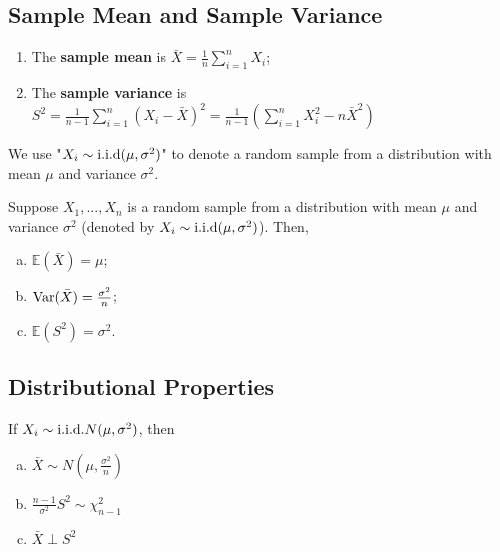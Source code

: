 \documentclass[11pt]{elegantbook}
\begin{document}
\subsection{Sample Mean and Sample Variance}
\begin{definition}
    \normalfont
    \begin{enumerate}
        \item The \textbf{sample mean} is $\bar{X}=\frac{1}{n}\sum_{i=1}^n X_i$;
        \item The \textbf{sample variance} is $S^2=\frac{1}{n-1}\sum_{i=1}^n (X_i-\bar{X})^2=\frac{1}{n-1}(\sum_{i=1}^n X_i^2 - n\bar{X}^2)$
    \end{enumerate}
\end{definition}

\begin{note}
    We use "$X_i\sim \textnormal{i.i.d}(\mu,\sigma^2)$" to denote a random sample from a distribution with mean $\mu$ and variance $\sigma^2$.
\end{note}

\begin{theorem}
    Suppose $X_1,...,X_n$ is a random sample from a distribution with mean $\mu$ and variance $\sigma^2$ (denoted by $X_i\sim \textnormal{i.i.d}(\mu,\sigma^2)$). Then,
    \begin{enumerate}[(a).]
        \item $\mathbb{E}(\bar{X})=\mu$;
        \item $\textnormal{Var}(\bar{X})=\frac{\sigma^2}{n}$;
        \item $\mathbb{E}(S^2)=\sigma^2$.
    \end{enumerate}
\end{theorem}


\subsection{Distributional Properties}
\begin{theorem}
    If $X_i\sim \textnormal{i.i.d.} N(\mu,\sigma^2)$, then
    \begin{enumerate}[(a).]
        \item $\bar{X}\sim N(\mu,\frac{\sigma^2}{n})$
        \item $\frac{n-1}{\sigma^2}S^2\sim \chi^2_{n-1}$
        \item $\bar{X}\perp S^2$
    \end{enumerate}
\end{theorem}
\end{document}
